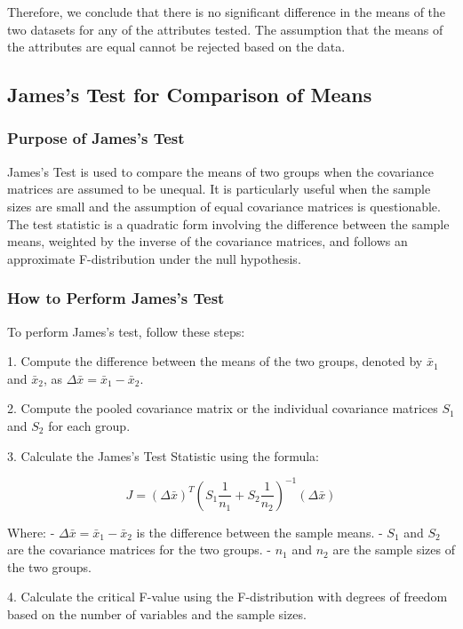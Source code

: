 \documentclass[11pt]{article}
\begin{document}
Therefore, we conclude that there is no significant difference in the means of the two datasets for any of the attributes tested. The assumption that the means of the attributes are equal cannot be rejected based on the data.

\subsection{James's Test for Comparison of Means}

\subsubsection{Purpose of James's Test}

James’s Test is used to compare the means of two groups when the covariance matrices are assumed to be unequal. It is particularly useful when the sample sizes are small and the assumption of equal covariance matrices is questionable. The test statistic is a quadratic form involving the difference between the sample means, weighted by the inverse of the covariance matrices, and follows an approximate F-distribution under the null hypothesis.

\subsubsection{How to Perform James's Test}

To perform James’s test, follow these steps:

1. Compute the difference between the means of the two groups, denoted by \( \bar{x}_1 \) and \( \bar{x}_2 \), as \( \Delta \bar{x} = \bar{x}_1 - \bar{x}_2 \).

2. Compute the pooled covariance matrix or the individual covariance matrices \( S_1 \) and \( S_2 \) for each group.

3. Calculate the James's Test Statistic using the formula:

   \[
   J = (\Delta \bar{x})^T \left( S_1 \frac{1}{n_1} + S_2 \frac{1}{n_2} \right)^{-1} (\Delta \bar{x})
   \]
   
   Where:
   - \( \Delta \bar{x} = \bar{x}_1 - \bar{x}_2 \) is the difference between the sample means.
   - \( S_1 \) and \( S_2 \) are the covariance matrices for the two groups.
   - \( n_1 \) and \( n_2 \) are the sample sizes of the two groups.
   
4. Calculate the critical F-value using the F-distribution with degrees of freedom based on the number of variables and the sample sizes.
\end{document}
